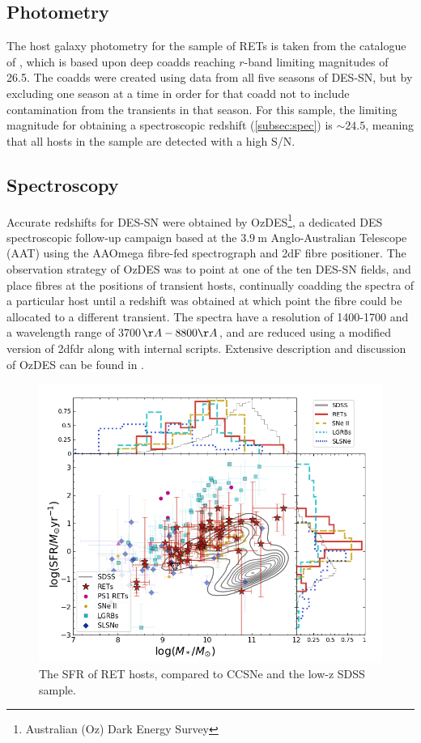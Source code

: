 \documentclass[fleqn,usenatbib,]{mnras}
\begin{document}
\subsection{Photometry \label{subsec:phot}}

The host galaxy photometry for the sample of RETs is taken from the catalogue of \citet{Wiseman2020}, which is based upon deep coadds reaching $r$-band limiting magnitudes of 26.5. The coadds were created using data from all five seasons of DES-SN, but by excluding one season at a time in order for that coadd not to include contamination from the transients in that season. For this sample, the limiting magnitude for obtaining a spectroscopic redshift (\ref{subsec:spec}) is $\sim 24.5$, meaning that all hosts in the sample are detected with a high S/N.

\subsection{Spectroscopy \label{subsec:spec}}
Accurate redshifts for DES-SN were obtained by OzDES\footnote{Australian (Oz) Dark Energy Survey}, a dedicated DES spectroscopic follow-up campaign based at the $3.9~\textrm{m}$ Anglo-Australian Telescope (AAT) using the AAOmega fibre-fed spectrograph and 2dF fibre positioner. The observation strategy of OzDES was to point at one of the ten DES-SN fields, and place fibres at the positions of transient hosts, continually coadding the spectra of a particular host until a redshift was obtained at which point the fibre could be allocated to a different transient. The spectra have a resolution of 1400-1700 and a wavelength range of 3700$\AA - 8800\AA$, and are reduced using a modified version of 2dfdr \citep{Croom2004} along with internal scripts. Extensive description and discussion of OzDES can be found in \citet{Yuan2015,Childress2017,Lidman2020}.

\begin{figure}
\includegraphics[width=\textwidth]{figs/SFR_Mike.png}
\caption{The SFR of RET hosts, compared to CCSNe and the low-z SDSS sample.
\label{fig:sfms_sfr}}
\end{figure}
\end{document}
